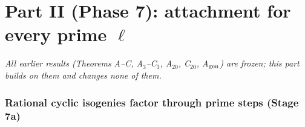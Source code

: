 \part*{Part II (Phase 7): attachment for every prime \texorpdfstring{$\ell$}{l}}

\emph{All earlier results (Theorems A--C, A$_3$--C$_3$, A$_{20}$, C$_{20}$, A$_{\rm gen}$) are frozen; this part builds on them
and changes none of them.}

\section{Rational cyclic isogenies factor through prime steps (Stage 7a)}\label{sec:7a}

